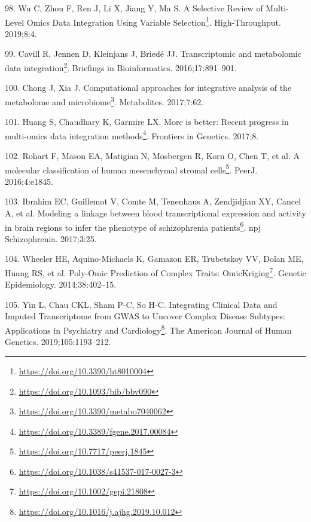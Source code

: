 \documentclass[
  a4paper,
]{book}
\DeclareRobustCommand{\href}[2]{#2\footnote{\url{#1}}}
\newlength{\cslhangindent}
\newlength{\cslentryspacingunit} %
\newenvironment{CSLReferences}[2] %
 {%
  \setlength{\parindent}{0pt}
  \ifodd #1
  \let\oldpar\par
  \def\par{\hangindent=\cslhangindent\oldpar}
  \fi
  \setlength{\parskip}{#2\cslentryspacingunit}
 }%
 {}
\begin{document}
\begin{CSLReferences}{0}{0}
\leavevmode{}%
98. Wu C, Zhou F, Ren J, Li X, Jiang Y, Ma S. \href{https://doi.org/10.3390/ht8010004}{A {Selective Review} of {Multi}-{Level Omics Data Integration Using Variable Selection}}. High-Throughput. 2019;8:4.

\leavevmode{}%
99. Cavill R, Jennen D, Kleinjans J, Briedé JJ. \href{https://doi.org/10.1093/bib/bbv090}{Transcriptomic and metabolomic data integration}. Briefings in Bioinformatics. 2016;17:891--901.

\leavevmode{}%
100. Chong J, Xia J. \href{https://doi.org/10.3390/metabo7040062}{Computational approaches for integrative analysis of the metabolome and microbiome}. Metabolites. 2017;7:62.

\leavevmode{}%
101. Huang S, Chaudhary K, Garmire LX. \href{https://doi.org/10.3389/fgene.2017.00084}{More is better: Recent progress in multi-omics data integration methods}. Frontiers in Genetics. 2017;8.

\leavevmode{}%
102. Rohart F, Mason EA, Matigian N, Mosbergen R, Korn O, Chen T, et al. \href{https://doi.org/10.7717/peerj.1845}{A molecular classification of human mesenchymal stromal cells}. PeerJ. 2016;4:e1845.

\leavevmode{}%
103. Ibrahim EC, Guillemot V, Comte M, Tenenhaus A, Zendjidjian XY, Cancel A, et al. \href{https://doi.org/10.1038/s41537-017-0027-3}{Modeling a linkage between blood transcriptional expression and activity in brain regions to infer the phenotype of schizophrenia patients}. npj Schizophrenia. 2017;3:25.

\leavevmode{}%
104. Wheeler HE, Aquino-Michaels K, Gamazon ER, Trubetskoy VV, Dolan ME, Huang RS, et al. \href{https://doi.org/10.1002/gepi.21808}{Poly-Omic Prediction of Complex Traits: OmicKriging}. Genetic Epidemiology. 2014;38:402--15.

\leavevmode{}%
105. Yin L, Chau CKL, Sham P-C, So H-C. \href{https://doi.org/10.1016/j.ajhg.2019.10.012}{Integrating Clinical Data and Imputed Transcriptome from GWAS to Uncover Complex Disease Subtypes: Applications in Psychiatry and Cardiology}. The American Journal of Human Genetics. 2019;105:1193--212.


\end{CSLReferences}
\end{document}
